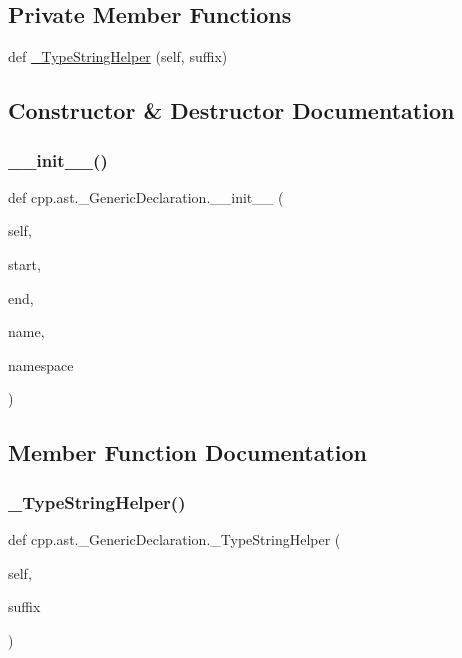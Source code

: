 \subsection*{Private Member Functions}
\begin{DoxyCompactItemize}
\item 
def \mbox{\hyperlink{classcpp_1_1ast_1_1___generic_declaration_a2ab2d07ccfa5d51ed153e82004c49e98}{\+\_\+\+Type\+String\+Helper}} (self, suffix)
\end{DoxyCompactItemize}


\subsection{Constructor \& Destructor Documentation}
\mbox{\label{classcpp_1_1ast_1_1___generic_declaration_afde72751e20708a7802eb7707d23bc3c}} 
\subsubsection{\texorpdfstring{\_\_init\_\_()}{\_\_init\_\_()}}
{\footnotesize\ttfamily def cpp.\+ast.\+\_\+\+Generic\+Declaration.\+\_\+\+\_\+init\+\_\+\+\_\+ (\begin{DoxyParamCaption}\item[{}]{self,  }\item[{}]{start,  }\item[{}]{end,  }\item[{}]{name,  }\item[{}]{namespace }\end{DoxyParamCaption})}



\subsection{Member Function Documentation}
\mbox{\label{classcpp_1_1ast_1_1___generic_declaration_a2ab2d07ccfa5d51ed153e82004c49e98}} 
\subsubsection{\texorpdfstring{\_TypeStringHelper()}{\_TypeStringHelper()}}
{\footnotesize\ttfamily def cpp.\+ast.\+\_\+\+Generic\+Declaration.\+\_\+\+Type\+String\+Helper (\begin{DoxyParamCaption}\item[{}]{self,  }\item[{}]{suffix }\end{DoxyParamCaption})\hspace{0.3cm}{\ttfamily [private]}}

